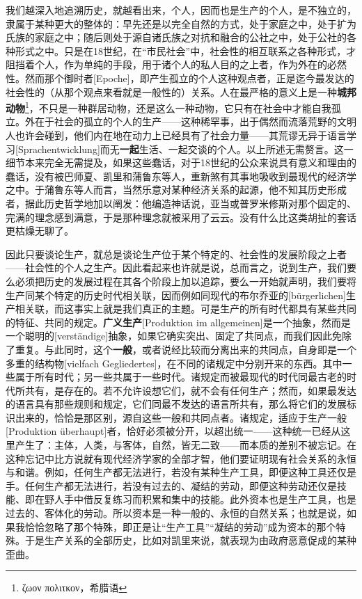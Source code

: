 \documentclass[a4paper,twoside,12pt]{ctexart}
\begin{document}
我们越深入地追溯历史，就越看出来，个人，因而也是生产的个人，是不独立的，隶属于某种更大的整体的：早先还是以完全自然的方式，处于家庭之中，处于扩为氏族的家庭之中；随后则处于源自诸氏族之对抗和融合的公社之中，处于公社的各种形式之中。只是在18世纪，在“市民社会”中，社会性的相互联系之各种形式，才阻挡着个人，作为单纯的手段，用于诸个人的私人目的之上者，作为外在的必然性。然而那个御时者[Epoche]，即产生孤立的个人这种观点者，正是迄今最发达的社会性的（从那个观点来看就是一般性的）关系。人在最严格的意义上是一种\textbf{城邦动物}\footnote{ζωον πολιτκον，希腊语}，不只是一种群居动物，还是这么一种动物，它只有在社会中才能自我孤立。外在于社会的孤立的个人的生产——这种稀罕事，出于偶然而流落荒野的文明人也许会碰到，他们内在地在动力上已经具有了社会力量——其荒谬无异于语言学习[Sprachentwicklung]而无\textbf{一起}生活、一起交谈的个人。以上所述无需赘言。这一细节本来完全无需提及，如果这些蠢话，对于18世纪的公众来说具有意义和理由的蠢话，没有被巴师夏、凯里和蒲鲁东等人，重新煞有其事地吸收到最现代的经济学之中。于蒲鲁东等人而言，当然乐意对某种经济关系的起源，他不知其历史形成者，据此历史哲学地加以阐发：他编造神话说，亚当或普罗米修斯对那个固定的、完满的理念感到满意，于是那种理念就被采用了云云。没有什么比这类胡扯的套话更枯燥无聊了。

因此只要谈论生产，就总是谈论生产位于某个特定的、社会性的发展阶段之上者——社会性的个人之生产。因此看起来也许就是说，总而言之，说到生产，我们要么必须把历史的发展过程在其各个阶段上加以追踪，要么一开始就声明，我们要将生产同某个特定的历史时代相关联，因而例如同现代的布尔乔亚的[bürgerlichen]生产相关联，而这事实上就是我们真正的主题。可是生产的所有时代都具有某些共同的特征、共同的规定。\textbf{广义生产}[Produktion im allgemeinen]是一个抽象，然而是一个聪明的[verständige]抽象，如果它确实突出、固定了共同点，而我们因此免除了重复。与此同时，这个\textbf{一般}，或者说经比较而分离出来的共同点，自身即是一个多重的结构物[vielfach Gegliedertes]，在不同的诸规定中分别开来的东西。其中一些属于所有时代；另一些共属于一些时代。诸规定而被最现代的时代同最古老的时代所共有，是存在的。若不允许设想它们，就不会有任何生产；然而，如果最发达的语言具有那些规则和规定，它们同最不发达的语言所共有，那么将它们的发展标识出来的，恰恰是那区别，源自这些一般和共同点者。诸规定，适应于生产一般[Produktion überhaupt]者，恰好必须被分开，以超出统一——这种统一已经从这里产生了：主体，人类，与客体，自然，皆无二致——而本质的差别不被忘记。在这种忘记中比方说就有现代经济学家的全部才智，他们要证明现有社会关系的永恒与和谐。例如，任何生产都无法进行，若没有某种生产工具，即便这种工具还仅是手。任何生产都无法进行，若没有过去的、凝结的劳动，即便这种劳动还仅是技能、即在野人手中借反复练习而积累和集中的技能。此外资本也是生产工具，也是过去的、客体化的劳动。所以资本是一种一般的、永恒的自然关系；也就是说，如果我恰恰忽略了那个特殊，即正是让“生产工具”“凝结的劳动”成为资本的那个特殊。于是生产关系的全部历史，比如对凯里来说，就表现为由政府恶意促成的某种歪曲。
\end{document}
